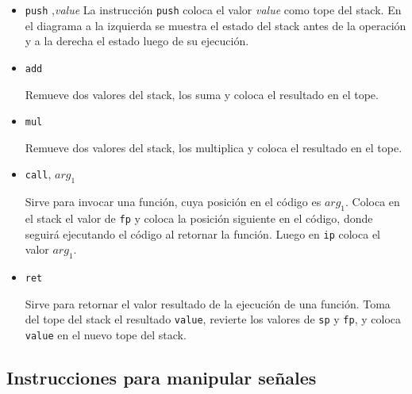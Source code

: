 \begin{itemize}

\item {
    \texttt{push} ,\textit{value}
    La instrucción \texttt{push} coloca el
    valor \textit{value} como tope del stack.
    En el diagrama a la izquierda se muestra el estado del stack antes
    de la operación y a la derecha el estado luego de su ejecución.

    
}
\item {
    \texttt{add}

      Remueve dos valores del stack, los suma y coloca el resultado en
    el tope.

    
}
\item {
    \texttt{mul}

      Remueve dos valores del stack, los multiplica y coloca el resultado en
    el tope.

    
}
\item {
    \texttt{call}, ${arg}_1$

    Sirve para invocar una función, cuya posición en el código es ${arg}_1$.
    Coloca en el stack el valor de \texttt{fp} y coloca la posición siguiente
    en el código, donde seguirá ejecutando el código al retornar la función.
    Luego en \texttt{ip} coloca el valor ${arg}_1$.

    
}
\item {
    \texttt{ret}

    Sirve para retornar el valor resultado de la ejecución de una función.
    Toma del tope del stack el resultado \texttt{value}, revierte los valores
    de \texttt{sp} y \texttt{fp}, y coloca \texttt{value} en el nuevo tope
    del stack.

    
}
\end{itemize}

\subsection{Instrucciones para manipular señales}
  
